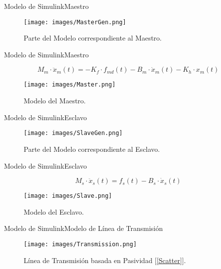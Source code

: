 \documentclass{beamer}
\begin{document}
\begin{frame}{Modelo de Simulink}{Maestro}
	
	\begin{figure}[h!]
		\centering
		\texttt{[image: images/MasterGen.png]}
		\caption{Parte del Modelo correspondiente al Maestro.}
		\label{MasterGen}
	\end{figure}
\end{frame}

\begin{frame}{Modelo de Simulink}{Maestro}
	
	\begin{equation}
		M_m \cdot \ddot{x}_m(t) = -K_f \cdot f_{md}(t) - B_m \cdot \dot{x}_m(t) - K_h \cdot x_m(t)
	\end{equation}
	
	\begin{figure}[h!]
		\centering
		\texttt{[image: images/Master.png]}
		\caption{Modelo del Maestro.}
		\label{Master}
	\end{figure}
\end{frame}

\begin{frame}{Modelo de Simulink}{Esclavo}
	
	\begin{figure}[h!]
		\centering
		\texttt{[image: images/SlaveGen.png]}
		\caption{Parte del Modelo correspondiente al Esclavo.}
		\label{SlaveGen}
	\end{figure}
\end{frame}

\begin{frame}{Modelo de Simulink}{Esclavo}
	
	\begin{equation}
	M_s \cdot \ddot{x}_s(t) = f_{s}(t) - B_s \cdot \dot{x}_s(t)
	\end{equation}
	
	\begin{figure}[h!]
		\centering
		\texttt{[image: images/Slave.png]}
		\caption{Modelo del Esclavo.}
		\label{Slave}
	\end{figure}
\end{frame}

\begin{frame}{Modelo de Simulink}{Modelo de Línea de Transmisión}
	
	\begin{figure}[h!]
		\centering
		\texttt{[image: images/Transmission.png]}
		\caption{Línea de Transmisión basada en Pasividad [\ref{Scatter}].}
		\label{Transmision}
	\end{figure}
\end{frame}
\end{document}
